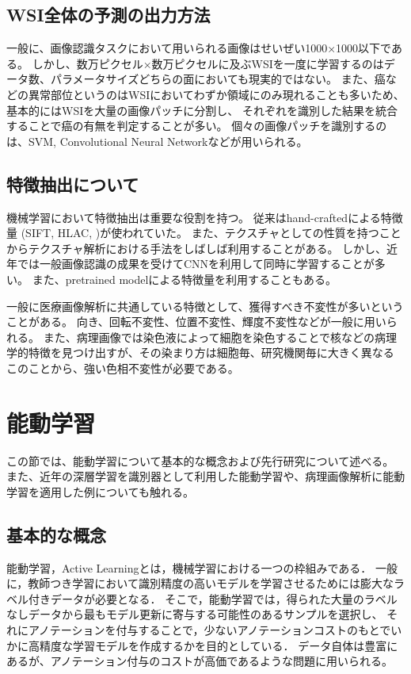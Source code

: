\subsection{WSI全体の予測の出力方法}
一般に、画像認識タスクにおいて用いられる画像はせいぜい1000×1000以下である。
しかし、数万ピクセル×数万ピクセルに及ぶWSIを一度に学習するのはデータ数、パラメータサイズどちらの面においても現実的ではない。
また、癌などの異常部位というのはWSIにおいてわずか領域にのみ現れることも多いため、基本的にはWSIを大量の画像パッチに分割し、
それぞれを識別した結果を統合することで癌の有無を判定することが多い。
個々の画像パッチを識別するのは、SVM, Convolutional Neural Networkなどが用いられる。

\subsection{特徴抽出について}
機械学習において特徴抽出は重要な役割を持つ。
従来はhand-craftedによる特徴量 (SIFT, HLAC,  )が使われていた。
また、テクスチャとしての性質を持つことからテクスチャ解析における手法をしばしば利用することがある。
しかし、近年では一般画像認識の成果を受けてCNNを利用して同時に学習することが多い。
また、pretrained modelによる特徴量を利用することもある。

一般に医療画像解析に共通している特徴として、獲得すべき不変性が多いということがある。
向き、回転不変性、位置不変性、輝度不変性などが一般に用いられる。
また、病理画像では染色液によって細胞を染色することで核などの病理学的特徴を見つけ出すが、その染まり方は細胞毎、研究機関毎に大きく異なる
このことから、強い色相不変性が必要である。

\section{能動学習}

この節では、能動学習について基本的な概念および先行研究について述べる。
また、近年の深層学習を識別器として利用した能動学習や、病理画像解析に能動学習を適用した例についても触れる。

\subsection{基本的な概念}
能動学習，Active Learning\cite{settles2010active}とは，機械学習における一つの枠組みである．
一般に，教師つき学習において識別精度の高いモデルを学習させるためには膨大なラベル付きデータが必要となる．
そこで，能動学習では，得られた大量のラベルなしデータから最もモデル更新に寄与する可能性のあるサンプルを選択し、
それにアノテーションを付与することで，少ないアノテーションコストのもとでいかに高精度な学習モデルを作成するかを目的としている．
データ自体は豊富にあるが、アノテーション付与のコストが高価であるような問題に用いられる。

